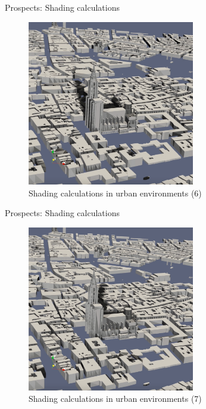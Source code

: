 \documentclass[10pt]{beamer}
\begin{document}
\begin{frame}{Prospects: Shading calculations}
  \begin{figure}
      \centering
      \includegraphics[width=0.65\textwidth]{images/shading-6.png}
      \caption{Shading calculations in urban environments (6)}
  \end{figure}
\end{frame}

\begin{frame}{Prospects: Shading calculations}
  \begin{figure}
      \centering
      \includegraphics[width=0.65\textwidth]{images/shading-7.png}
      \caption{Shading calculations in urban environments (7)}
  \end{figure}
\end{frame}
\end{document}
